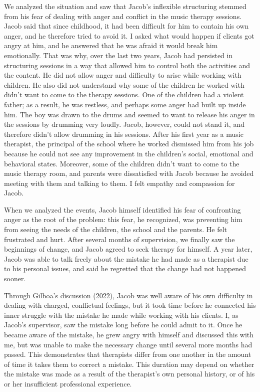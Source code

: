 \documentclass[authordate, empirical, issue]{jote-new-article}
\begin{document}
We analyzed the situation and saw that Jacob's inflexible structuring stemmed from his fear of dealing with anger and conflict in the music therapy sessions. Jacob said that since childhood, it had been difficult for him to contain his own anger, and he therefore tried to avoid it. I asked what would happen if clients got angry at him, and he answered that he was afraid it would break him emotionally. That was why, over the last two years, Jacob had persisted in structuring sessions in a way that allowed him to control both the activities and the content. He did not allow anger and difficulty to arise while working with children. He also did not understand why some of the children he worked with didn't want to come to the therapy sessions. One of the children had a violent father; as a result, he was restless, and perhaps some anger had built up inside him. The boy was drawn to the drums and seemed to want to release his anger in the sessions by drumming very loudly. Jacob, however, could not stand it, and therefore didn't allow drumming in his sessions. After his first year as a music therapist, the principal of the school where he worked dismissed him from his job because he could not see any improvement in the children's social, emotional and behavioral states. Moreover, some of the children didn't want to come to the music therapy room, and parents were dissatisfied with Jacob because he avoided meeting with them and talking to them. I felt empathy and compassion for Jacob.







When we analyzed the events, Jacob himself identified his fear of confronting anger as the root of the problem: this fear, he recognized, was preventing him from seeing the needs of the children, the school and the parents. He felt frustrated and hurt. After several months of supervision, we finally saw the beginnings of change, and Jacob agreed to seek therapy for himself. A year later, Jacob was able to talk freely about the mistake he had made as a therapist due to his personal issues, and said he regretted that the change had not happened sooner.



Through Gilboa's discussion (2022), Jacob was well aware of his own difficulty in dealing with charged, conflictual feelings, but it took time before he connected his inner struggle with the mistake he made while working with his clients. I, as Jacob's supervisor, saw the mistake long before he could admit to it. Once he became aware of the mistake, he grew angry with himself and discussed this with me, but was unable to make the necessary change until several more months had passed. This demonstrates that therapists differ from one another in the amount of time it takes them to correct a mistake. This duration may depend on whether the mistake was made as a result of the therapist's own personal history, or of his or her insufficient professional experience.
\end{document}
